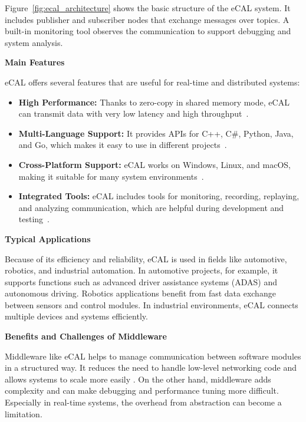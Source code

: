 \newpage
Figure~\ref{fig:ecal_architecture} shows the basic structure of the eCAL system. It includes publisher and subscriber nodes that exchange messages over topics. A built-in monitoring tool observes the communication to support debugging and system analysis.

\vspace{1.2em}
\textbf{Main Features}

\vspace{0.4em}
eCAL offers several features that are useful for real-time and distributed systems:

\begin{itemize}
	\item \textbf{High Performance:} Thanks to zero-copy in shared memory mode, eCAL can transmit data with very low latency and high throughput~\cite{ecal_github,ecal_official_docs}.
	
	\item \textbf{Multi-Language Support:} It provides APIs for C++, C\#, Python, Java, and Go, which makes it easy to use in different projects~\cite{ecal_official_docs}.
	
	\item \textbf{Cross-Platform Support:} eCAL works on Windows, Linux, and macOS, making it suitable for many system environments~\cite{ecal_official_docs}.
	
	\item \textbf{Integrated Tools:} eCAL includes tools for monitoring, recording, replaying, and analyzing communication, which are helpful during development and testing~\cite{ecal_github,ecal_official_docs}.
\end{itemize}

\textbf{Typical Applications}

\vspace{0.4em}
Because of its efficiency and reliability, eCAL is used in fields like automotive, robotics, and industrial automation. In automotive projects, for example, it supports functions such as advanced driver assistance systems (ADAS) and autonomous driving. Robotics applications benefit from fast data exchange between sensors and control modules. In industrial environments, eCAL connects multiple devices and systems efficiently.

\vspace{1.2em}
\textbf{Benefits and Challenges of Middleware}

\vspace{0.4em}
Middleware like eCAL helps to manage communication between software modules in a structured way. It reduces the need to handle low-level networking code and allows systems to scale more easily \cite{josuttis2007, coulouris2012}. On the other hand, middleware adds complexity and can make debugging and performance tuning more difficult. Especially in real-time systems, the overhead from abstraction can become a limitation.

